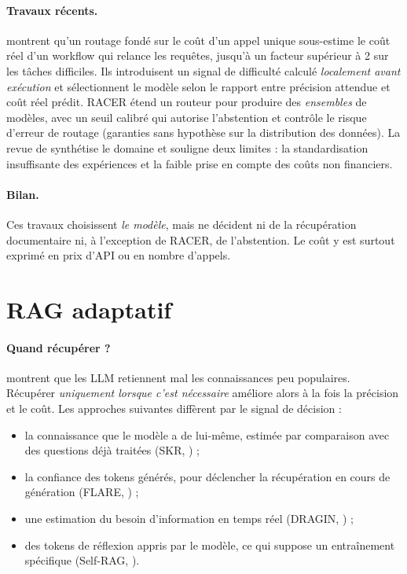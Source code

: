 \documentclass[11pt,a4paper]{article}
\begin{document}
\paragraph{Travaux récents.} \citet{fu2026inflation} montrent qu'un routage fondé sur le coût d'un
appel unique sous-estime le coût réel d'un workflow qui relance les requêtes, jusqu'à un facteur
supérieur à 2 sur les tâches difficiles. Ils introduisent un signal de difficulté calculé
\emph{localement avant exécution} et sélectionnent le modèle selon le rapport entre précision attendue
et coût réel prédit. RACER \citep{hao2026racer} étend un routeur pour produire des \emph{ensembles} de
modèles, avec un seuil calibré qui autorise l'abstention et contrôle le risque d'erreur de routage
(garanties sans hypothèse sur la distribution des données). La revue de \citet{varangot2025survey}
synthétise le domaine et souligne deux limites : la standardisation insuffisante des expériences et la
faible prise en compte des coûts non financiers.

\paragraph{Bilan.} Ces travaux choisissent \emph{le modèle}, mais ne décident ni de la récupération
documentaire ni, à l'exception de RACER, de l'abstention. Le coût y est surtout exprimé en prix d'API
ou en nombre d'appels.

\section{RAG adaptatif}\label{sec:rag}

\paragraph{Quand récupérer ?} \citet{mallen2022trust} montrent que les LLM retiennent mal les
connaissances peu populaires. Récupérer \emph{uniquement lorsque c'est nécessaire} améliore alors à la
fois la précision et le coût. Les approches suivantes diffèrent par le signal de décision :
\begin{itemize}
\item la connaissance que le modèle a de lui-même, estimée par comparaison avec des questions déjà
traitées (SKR, \citealp{wang2023skr}) ;
\item la confiance des tokens générés, pour déclencher la récupération en cours de génération (FLARE,
\citealp{jiang2023flare}) ;
\item une estimation du besoin d'information en temps réel (DRAGIN, \citealp{su2024dragin}) ;
\item des tokens de réflexion appris par le modèle, ce qui suppose un entraînement spécifique
(Self-RAG, \citealp{asai2023selfrag}).
\end{itemize}
\end{document}
